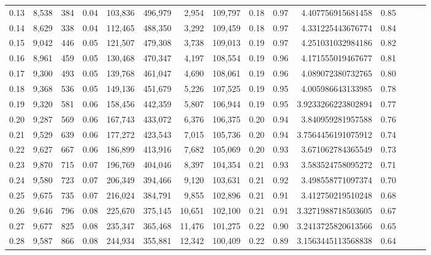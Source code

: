 \begin{tabular}{rrrrrrrrrrrrrrr}
0.13 &   8,538 &    384 &  0.04 &  103,836 &  496,979 &    2,954 &  109,797 &  0.18 &  0.97 &     4.407756915681458 &      0.85 \\
0.14 &   8,629 &    338 &  0.04 &  112,465 &  488,350 &    3,292 &  109,459 &  0.18 &  0.97 &     4.331225443676774 &      0.84 \\
0.15 &   9,042 &    446 &  0.05 &  121,507 &  479,308 &    3,738 &  109,013 &  0.19 &  0.97 &     4.251031032984186 &      0.82 \\
0.16 &   8,961 &    459 &  0.05 &  130,468 &  470,347 &    4,197 &  108,554 &  0.19 &  0.96 &     4.171555019467677 &      0.81 \\
0.17 &   9,300 &    493 &  0.05 &  139,768 &  461,047 &    4,690 &  108,061 &  0.19 &  0.96 &     4.089072380732765 &      0.80 \\
0.18 &   9,368 &    536 &  0.05 &  149,136 &  451,679 &    5,226 &  107,525 &  0.19 &  0.95 &     4.005986643133985 &      0.78 \\
0.19 &   9,320 &    581 &  0.06 &  158,456 &  442,359 &    5,807 &  106,944 &  0.19 &  0.95 &    3.9233266223802894 &      0.77 \\
0.20 &   9,287 &    569 &  0.06 &  167,743 &  433,072 &    6,376 &  106,375 &  0.20 &  0.94 &     3.840959281957588 &      0.76 \\
0.21 &   9,529 &    639 &  0.06 &  177,272 &  423,543 &    7,015 &  105,736 &  0.20 &  0.94 &    3.7564456191075912 &      0.74 \\
0.22 &   9,627 &    667 &  0.06 &  186,899 &  413,916 &    7,682 &  105,069 &  0.20 &  0.93 &     3.671062784365549 &      0.73 \\
0.23 &   9,870 &    715 &  0.07 &  196,769 &  404,046 &    8,397 &  104,354 &  0.21 &  0.93 &     3.583524758095272 &      0.71 \\
0.24 &   9,580 &    723 &  0.07 &  206,349 &  394,466 &    9,120 &  103,631 &  0.21 &  0.92 &     3.498558771097374 &      0.70 \\
0.25 &   9,675 &    735 &  0.07 &  216,024 &  384,791 &    9,855 &  102,896 &  0.21 &  0.91 &     3.412750219510248 &      0.68 \\
0.26 &   9,646 &    796 &  0.08 &  225,670 &  375,145 &   10,651 &  102,100 &  0.21 &  0.91 &    3.3271988718503605 &      0.67 \\
0.27 &   9,677 &    825 &  0.08 &  235,347 &  365,468 &   11,476 &  101,275 &  0.22 &  0.90 &    3.2413725820613566 &      0.65 \\
0.28 &   9,587 &    866 &  0.08 &  244,934 &  355,881 &   12,342 &  100,409 &  0.22 &  0.89 &    3.1563445113568838 &      0.64 \\

\end{tabular}
